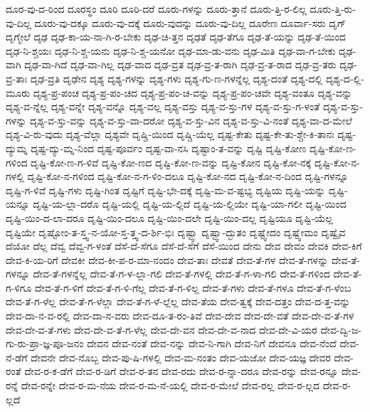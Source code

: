 {ದೂರ-ವು-ದ-ರಿಂದ
ದೂರಸ್ಥಂ
ದೂರಿ
ದೂರಿ-ದರೆ
ದೂರು-ಗಳನ್ನು
ದೂರು-ತ್ತಾನೆ
ದೂರು-ತ್ತಿ-ರ-ಲಿಲ್ಲ
ದೂರು-ತ್ತಿ-ರು-ವು-ದಿಲ್ಲ
ದೂರು-ವು-ದಕ್ಕೂ
ದೂರು-ವು-ದಕ್ಕೆ
ದೂರು-ವುದನ್ನು
ದೂರು-ವು-ದಿಲ್ಲ
ದೂರೇಣ
ದೂರ್ವಾ-ಸರು
ದೃಗ್
ದೃಗ್ಮೇಲೆ
ದೃಢ
ದೃಢ-ಕಾ-ಯ-ನಾ-ಗಿ-ರ-ಬೇಕು
ದೃಢ-ಚಿ-ತ್ತನ
ದೃಢತೆ
ದೃಢ-ತೆಗೂ
ದೃಢ-ತೆ-ಯನ್ನು
ದೃಢ-ತೆ-ಯಿಂದ
ದೃಢ-ನಿ-ಶ್ಚಯಃ
ದೃಢ-ನಿ-ಶ್ಚ-ಯನು
ದೃಢ-ನಿ-ಶ್ಚ-ಯನೋ
ದೃಢ-ಮಾ-ಡು-ವನು
ದೃಢ-ಮಿತಿ
ದೃಢ-ವಾ-ಗ-ಬೇಕು
ದೃಢ-ವಾಗಿ
ದೃಢ-ವಾ-ಗಿದೆ
ದೃಢ-ವಾ-ಗಿಲ್ಲ
ದೃಢ-ವಾದ
ದೃಢ-ವ್ರತ
ದೃಢ-ವ್ರ-ತ-ರಾಗಿ
ದೃಢ-ವ್ರ-ತ-ರಾದ
ದೃಢ-ವ್ರ-ತರು
ದೃಢ-ವ್ರ-ತಾಃ
ದೃಢ-ವ್ರತಿ
ದೃಢೇನ
ದೃಶ್ಯ
ದೃಶ್ಯ-ಗಳನ್ನು
ದೃಶ್ಯ-ಗಳು
ದೃಶ್ಯ-ಗು-ಣ-ಗಳನ್ನೆಲ್ಲ
ದೃಶ್ಯ-ದಂತೆ
ದೃಶ್ಯ-ದಲ್ಲಿ
ದೃಶ್ಯ-ದ-ಲ್ಲಿ-ಮೂರು
ದೃಶ್ಯ-ಪ್ರ-ಪಂಚ
ದೃಶ್ಯ-ಪ್ರ-ಪಂ-ಚದ
ದೃಶ್ಯ-ಪ್ರ-ಪಂ-ಚ-ವನ್ನು
ದೃಶ್ಯ-ಪ್ರ-ಪಂ-ಚವೇ
ದೃಶ್ಯ-ವಂತೂ
ದೃಶ್ಯ-ವನ್ನು
ದೃಶ್ಯ-ವ-ನ್ನೆಲ್ಲ
ದೃಶ್ಯ-ವನ್ನೇ
ದೃಶ್ಯ-ವನ್ನೊ
ದೃಶ್ಯ-ವಲ್ಲ
ದೃಶ್ಯ-ವಸ್ತು
ದೃಶ್ಯ-ವ-ಸ್ತು-ಗಳ
ದೃಶ್ಯ-ವ-ಸ್ತು-ಗ-ಳಂತೆ
ದೃಶ್ಯ-ವ-ಸ್ತು-ಗಳನ್ನು
ದೃಶ್ಯ-ವ-ಸ್ತು-ವನ್ನು
ದೃಶ್ಯ-ವ-ಸ್ತು-ವಾ-ದರೋ
ದೃಶ್ಯ-ವ-ಸ್ತು-ವಿನ
ದೃಶ್ಯ-ವ-ಸ್ತು-ವಿ-ನಂತೆ
ದೃಶ್ಯ-ವಾ-ದ-ಮೇಲೆ
ದೃಶ್ಯ-ವಿ-ರು-ವುದು
ದೃಶ್ಯ-ವೆಲ್ಲಾ
ದೃಶ್ಯವೇ
ದೃಷ್ಚಿ-ಯಿಂದ
ದೃಷ್ಚಿ-ಯೆಲ್ಲ
ದೃಷ್ಟ-ಕೇತು
ದೃಷ್ಟ-ಕೇ-ತು-ಶ್ಚೇ-ಕಿ-ತಾನಃ
ದೃಷ್ಟ-ದ್ಯುಮ್ನ
ದೃಷ್ಟ-ದ್ಯು-ಮ್ನ-ನಿಂದ
ದೃಷ್ಟ-ಪೂರ್ವಂ
ದೃಷ್ಟ-ವಾ-ನಸಿ
ದೃಷ್ಟಾಂ-ತ-ವನ್ನು
ದೃಷ್ಟಿ
ದೃಷ್ಟಿ-ಕೋಣ
ದೃಷ್ಟಿ-ಕೋ-ಣ-ಗಳಿಂದ
ದೃಷ್ಟಿ-ಕೋ-ಣ-ಗ-ಳಿವೆ
ದೃಷ್ಟಿ-ಕೋ-ಣದ
ದೃಷ್ಟಿ-ಕೋ-ಣ-ವನ್ನು
ದೃಷ್ಟಿ-ಕೋನ
ದೃಷ್ಟಿ-ಕೋ-ನಕ್ಕೆ
ದೃಷ್ಟಿ-ಕೋ-ನ-ಗಳಲ್ಲಿ
ದೃಷ್ಟಿ-ಕೋ-ನ-ಗಳಿಂದ
ದೃಷ್ಟಿ-ಕೋ-ನ-ಗ-ಳಿಂ-ದಲೂ
ದೃಷ್ಟಿ-ಕೋ-ನದ
ದೃಷ್ಟಿ-ಕೋ-ನ-ದಿಂದ
ದೃಷ್ಟಿ-ಗಳನ್ನೂ
ದೃಷ್ಟಿ-ಗ-ಳಿವೆ
ದೃಷ್ಟಿ-ಗಳು
ದೃಷ್ಟಿ-ಗಿಂತ
ದೃಷ್ಟಿಗೆ
ದೃಷ್ಟಿ-ಭೇ-ದಕ್ಕೆ
ದೃಷ್ಟಿ-ಮ-ವ-ಷ್ಟಭ್ಯ
ದೃಷ್ಟಿಯ
ದೃಷ್ಟಿ-ಯನ್ನು
ದೃಷ್ಟಿ-ಯನ್ನೂ
ದೃಷ್ಟಿ-ಯ-ಲ್ಲಾ-ದರೊ
ದೃಷ್ಟಿ-ಯಲ್ಲಿ
ದೃಷ್ಟಿ-ಯ-ಲ್ಲಿದೆ
ದೃಷ್ಟಿ-ಯ-ಲ್ಲಿಯೇ
ದೃಷ್ಟಿ-ಯಾ-ಗಲೀ
ದೃಷ್ಟಿ-ಯಿಂದ
ದೃಷ್ಟಿ-ಯಿಂ-ದ-ಲಾ-ದರೂ
ದೃಷ್ಟಿ-ಯಿಂ-ದಲೂ
ದೃಷ್ಟಿ-ಯಿಂ-ದಲೇ
ದೃಷ್ಟಿ-ಯಿಂ-ದಲ್ಲ
ದೃಷ್ಟಿಯೂ
ದೃಷ್ಟಿ-ಯೆಲ್ಲ
ದೃಷ್ಟಿಯೇ
ದೃಷ್ಟೋಂ-ತ-ಸ್ತ್ವ-ನ-ಯೋ-ಸ್ತ-ತ್ತ್ವ-ದ-ರ್ಶಿ-ಭಿಃ
ದೃಷ್ಟ್ವಾ
ದೃಷ್ಟ್ವಾ-ದ್ಭುತಂ
ದೃಷ್ಟ್ವೇದಂ
ದೃಷ್ಟ್ವೇಮಂ
ದೃಷ್ವೈವ
ದೆಯೋ
ದೆಲ್ಲ
ದೆವ್ವ
ದೆವ್ವ-ಗ-ಳಂತೆ
ದೆಸೆ-ದೆ-ಸೆಗೂ
ದೆಸೆ-ದೆ-ಸೆಗೆ
ದೆಸೆ-ಯಿಂದ
ದೇನು
ದೇವ
ದೇವಂ
ದೇವಕಿ
ದೇವ-ಕಿಗೆ
ದೇವ-ಕಿ-ಯ-ರಿಗೆ
ದೇವಕೀ
ದೇವ-ಕೀ-ಪ-ರ-ಮಾ-ನಂದಂ
ದೇವ-ತಾಃ
ದೇವತೆ
ದೇವ-ತೆ-ಗಳ
ದೇವ-ತೆ-ಗಳನ್ನು
ದೇವ-ತೆ-ಗಳನ್ನೂ
ದೇವ-ತೆ-ಗಳನ್ನೆಲ್ಲ
ದೇವ-ತೆ-ಗ-ಳ-ಲ್ಲಾ-ಗಲಿ
ದೇವ-ತೆ-ಗಳಲ್ಲಿ
ದೇವ-ತೆ-ಗ-ಳಾ-ಗಲಿ
ದೇವ-ತೆ-ಗಳಿಂದ
ದೇವ-ತೆ-ಗ-ಳಿಗೂ
ದೇವ-ತೆ-ಗ-ಳಿಗೆ
ದೇವ-ತೆ-ಗ-ಳಿ-ಗೆಲ್ಲ
ದೇವ-ತೆ-ಗ-ಳಿಲ್ಲ
ದೇವ-ತೆ-ಗಳು
ದೇವ-ತೆ-ಗಳೂ
ದೇವ-ತೆ-ಗ-ಳೆಂಬ
ದೇವ-ತೆ-ಗ-ಳೆಲ್ಲ
ದೇವ-ತೆ-ಗ-ಳೆಲ್ಲಾ
ದೇವ-ತೆ-ಗ-ಳೆ-ಲ್ಲೆಲ್ಲ
ದೇವ-ತೆಯ
ದೇವ-ತ್ವಕ್ಕೆ
ದೇವ-ದತ್ತಂ
ದೇವ-ದ-ತ್ತ-ವನ್ನು
ದೇವ-ದಾ-ನ-ವ-ರಲ್ಲಿ
ದೇವ-ದಾ-ನ-ವರು
ದೇವ-ದೂ-ತ-ರಂ-ತಿವೆ
ದೇವ-ದೇವ
ದೇವ-ದೇ-ವತೆ
ದೇವ-ದೇ-ವ-ತೆ-ಗಳ
ದೇವ-ದೇ-ವ-ತೆ-ಗಳು
ದೇವ-ದೇ-ವ-ತೆ-ಗ-ಳೆಲ್ಲ
ದೇವ-ದೇ-ವನ
ದೇವ-ದೇ-ವ-ನಾದ
ದೇವ-ದೇ-ವಿ-ಯರ
ದೇವ-ದ್ವಿ-ಜ-ಗು-ರು-ಪ್ರಾ-ಜ್ಞ-ಪೂ-ಜನಂ
ದೇವನ
ದೇವ-ನಂತೆ
ದೇವ-ನನ್ನು
ದೇವ-ನಿ-ಗಾಗಿ
ದೇವ-ನಿಗೆ
ದೇವನೂ
ದೇವ-ನೆಂದೆ
ದೇವ-ನೆ-ಡೆಗೆ
ದೇವನೇ
ದೇವ-ನೊಬ್ಬ
ದೇವ-ಪು-ಷಿ-ಗಳಲ್ಲಿ
ದೇವ-ಮ-ನಂತಂ
ದೇವ-ಯಜೋ
ದೇವ-ಯಜ್ಞ
ದೇವರ
ದೇವ-ರಂತೆ
ದೇವ-ರ-ಕ-ಡೆಗೆ
ದೇವ-ರ-ಡಿಗೆ
ದೇವ-ರ-ತನ
ದೇವ-ರದು
ದೇವ-ರ-ನ್ನಾ-ದರೂ
ದೇವ-ರನ್ನು
ದೇವ-ರನ್ನೂ
ದೇವ-ರನ್ನೆ
ದೇವ-ರನ್ನೇ
ದೇವ-ರ-ಮ-ನೆಯ
ದೇವ-ರ-ಮ-ನೆ-ಯಲ್ಲಿ
ದೇವ-ರ-ಮೇಲೆ
ದೇವ-ರಲ್ಲ
ದೇವ-ರ-ಲ್ಲದ
ದೇವ-ರ-ಲ್ಲದೆ
}
